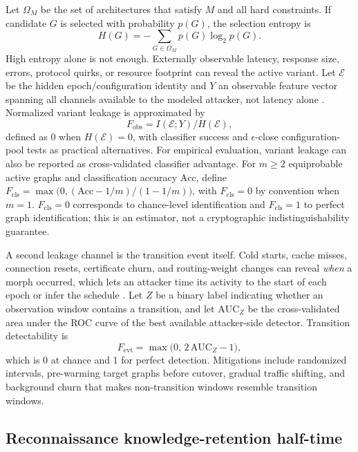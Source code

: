 \documentclass[11pt,letterpaper]{article}
\begin{document}
Let $\Omega_M$ be the set of architectures that satisfy $M$ and all hard constraints. If candidate $G$ is selected with probability $p(G)$, the selection entropy is
\begin{equation}
H(G)=-\sum_{G\in\Omega_M}p(G)\log_2p(G).
\end{equation}
High entropy alone is not enough. Externally observable latency, response size, errors, protocol quirks, or resource footprint can reveal the active variant. Let $\mathcal{E}$ be the hidden epoch/configuration identity and $Y$ an observable feature vector spanning all channels available to the modeled attacker, not latency alone \cite{sengupta2026}. Normalized variant leakage is approximated by
\begin{equation}
F_{\mathrm{obs}}=I(\mathcal{E};Y)/H(\mathcal{E}),
\end{equation}
defined as 0 when $H(\mathcal{E})=0$, with classifier success and $\epsilon$-close configuration-pool tests as practical alternatives. For empirical evaluation, variant leakage can also be reported as cross-validated classifier advantage. For $m\ge2$ equiprobable active graphs and classification accuracy $\mathrm{Acc}$, define $F_{\mathrm{cls}}=\max\big(0,(\mathrm{Acc}-1/m)/(1-1/m)\big)$, with $F_{\mathrm{cls}}=0$ by convention when $m=1$. $F_{\mathrm{cls}}=0$ corresponds to chance-level identification and $F_{\mathrm{cls}}=1$ to perfect graph identification; this is an estimator, not a cryptographic indistinguishability guarantee.

A second leakage channel is the transition event itself. Cold starts, cache misses, connection resets, certificate churn, and routing-weight changes can reveal \emph{when} a morph occurred, which lets an attacker time its activity to the start of each epoch or infer the schedule \cite{moghaddam2024}. Let $Z$ be a binary label indicating whether an observation window contains a transition, and let $\mathrm{AUC}_Z$ be the cross-validated area under the ROC curve of the best available attacker-side detector. Transition detectability is
\begin{equation}\label{eq:fevt}
F_{\mathrm{evt}}=\max\big(0,\,2\,\mathrm{AUC}_Z-1\big),
\end{equation}
which is 0 at chance and 1 for perfect detection. Mitigations include randomized intervals, pre-warming target graphs before cutover, gradual traffic shifting, and background churn that makes non-transition windows resemble transition windows.

\subsection{Reconnaissance knowledge-retention half-time}\label{sec:retention}
\end{document}
